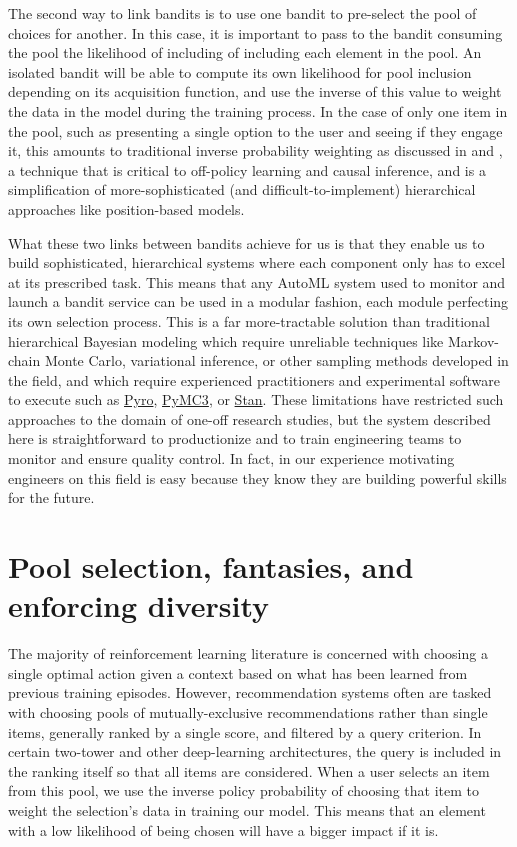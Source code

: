 \documentclass[manuscript, nonacm, screen=true]{acmart}
\begin{document}
The second way to link bandits is to use one bandit to pre-select the pool of choices for another. In this case, it is important to pass to the bandit consuming the pool the likelihood of including of including each element in the pool.  An isolated bandit will be able to compute its own likelihood for pool inclusion depending on its acquisition function, and use the inverse of this value to weight the data in the model during the training process. In the case of only one item in the pool, such as presenting a single option to the user and seeing if they engage it, this amounts to traditional inverse probability weighting as discussed in \cite{Mason_Real-World_Reinforcement_Learning_2021} and \cite{sutton_barto_rl}, a technique that is critical to off-policy learning and causal inference, and is a simplification of more-sophisticated (and difficult-to-implement) hierarchical approaches like position-based models\cite{zappella_position_based}.

What these two links between bandits achieve for us is that they enable us to build sophisticated, hierarchical systems where each component only has to excel at its prescribed task. This means that any AutoML system used to monitor and launch a bandit service can be used in a modular fashion, each module perfecting its own selection process. This is a far more-tractable solution than traditional hierarchical Bayesian modeling which require unreliable techniques like Markov-chain Monte Carlo, variational inference, or other sampling methods developed in the field, and which require experienced practitioners and experimental software to execute such as \href{http://www.pyro.ai}{Pyro},  \href{https://docs.pymc.io/en/v3/}{PyMC3}, or \href{https://mc-stan.org}{Stan}. These limitations have restricted such approaches to the domain of one-off research studies, but the system described here is straightforward to productionize and to train engineering teams to monitor and ensure quality control. In fact, in our experience motivating engineers on this field is easy because they know they are building powerful skills for the future.

\section{Pool selection, fantasies, and enforcing diversity}

The majority of reinforcement learning literature is concerned with choosing a single optimal action given a context based on what has been learned from previous training episodes. However, recommendation systems often are tasked with choosing pools of mutually-exclusive recommendations rather than single items, generally ranked by a single score, and filtered by a query criterion. In certain two-tower and other deep-learning architectures, the query is included in the ranking itself so that all items are considered. When a user selects an item from this pool, we use the inverse policy probability of choosing that item to weight the selection's data in training our model. This means that an element with a low likelihood of being chosen will have a bigger impact if it is.
\end{document}
